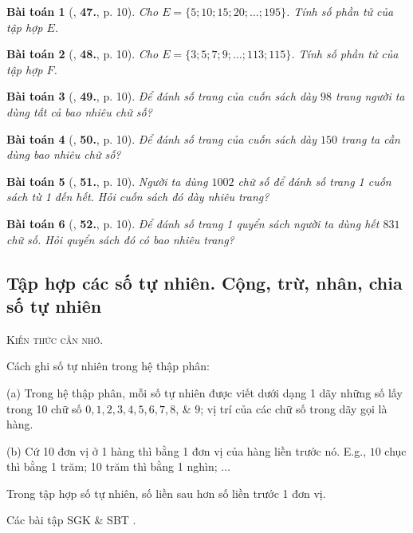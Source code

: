 \documentclass{article}
\numberwithin{equation}{section}
\newtheorem{baitoan}{Bài toán}[section]
\begin{document}
\begin{baitoan}[\cite{Trong_Toan_6_2021}, \textbf{47.}, p. 10]
	Cho $E = \{5;10;15;20;\ldots;195\}$. Tính số phần tử của tập hợp $E$.
\end{baitoan}

\begin{baitoan}[\cite{Trong_Toan_6_2021}, \textbf{48.}, p. 10]
	Cho $E = \{3;5;7;9;\ldots;113;115\}$. Tính số phần tử của tập hợp $F$.
\end{baitoan}

\begin{baitoan}[\cite{Trong_Toan_6_2021}, \textbf{49.}, p. 10]
	Để đánh số trang của cuốn sách dày $98$ trang người ta dùng tất cả bao nhiêu chữ số?
\end{baitoan}

\begin{baitoan}[\cite{Trong_Toan_6_2021}, \textbf{50.}, p. 10]
	Để đánh số trang của cuốn sách dày $150$ trang ta cần dùng bao nhiêu chữ số?
\end{baitoan}

\begin{baitoan}[\cite{Trong_Toan_6_2021}, \textbf{51.}, p. 10]
	Người ta dùng $1002$ chữ số để đánh số trang 1 cuốn sách từ 1 đến hết. Hỏi cuốn sách đó dày nhiêu trang?
\end{baitoan}

\begin{baitoan}[\cite{Trong_Toan_6_2021}, \textbf{52.}, p. 10]
	Để đánh số trang 1 quyển sách người ta dùng hết $831$ chữ số. Hỏi quyển sách đó có bao nhiêu trang?
\end{baitoan}

\subsection{Tập hợp các số tự nhiên. Cộng, trừ, nhân, chia số tự nhiên}
\textsc{Kiến thức cần nhớ.}
\begin{tcolorbox}
	Cách ghi số tự nhiên trong hệ thập phân:
	\begin{enumerate*}
		\item[(a)] Trong hệ thập phân, mỗi số tự nhiên được viết dưới dạng 1 dãy những số lấy trong 10 chữ số $0,1,2,3,4,5,6,7,8$, \& $9$; vị trí của các chữ số trong dãy gọi là hàng.
		\item[(b)] Cứ 10 đơn vị ở 1 hàng thì bằng 1 đơn vị của hàng liền trước nó. E.g., $10$ chục thì bằng 1 trăm; 10 trăm thì bằng 1 nghìn; $\ldots$
	\end{enumerate*}
	Trong tập hợp số tự nhiên, số liền sau hơn số liền trước 1 đơn vị.
\end{tcolorbox}
Các bài tập SGK \cite[\textbf{1}--\textbf{4}, pp. 7--8]{SGK_Toan_6_Canh_Dieu_tap_1} \& SBT \cite[Ví dụ 1--3, pp. 7--8; \textbf{9}--\textbf{14}, pp. 8--9]{SBT_Toan_6_Canh_Dieu_tap_1}.
\end{document}
